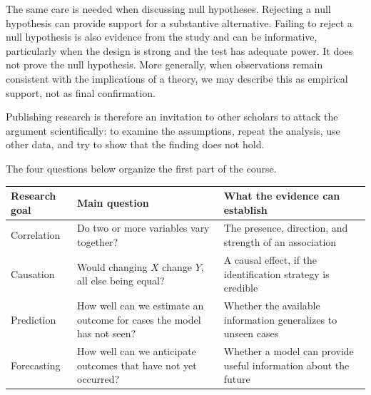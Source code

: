 \documentclass[
  a4paper,
]{scrbook}
\newcounter{none} %
\begin{document}
The same care is needed when discussing null hypotheses. Rejecting a
null hypothesis can provide support for a substantive alternative.
Failing to reject a null hypothesis is also evidence from the study and
can be informative, particularly when the design is strong and the test
has adequate power. It does not prove the null hypothesis. More
generally, when observations remain consistent with the implications of
a theory, we may describe this as empirical support, not as final
confirmation.

Publishing research is therefore an invitation to other scholars to
attack the argument scientifically: to examine the assumptions, repeat
the analysis, use other data, and try to show that the finding does not
hold.

The four questions below organize the first part of the course.

{\def\LTcaptype{none} %
\begin{longtable}[]{@{}
  >{\raggedright\arraybackslash}p{}
  >{\raggedright\arraybackslash}p{}
  >{\raggedright\arraybackslash}p{}@{}}
\toprule\noalign{}
\begin{minipage}[b]{\linewidth}\raggedright
Research goal
\end{minipage} & \begin{minipage}[b]{\linewidth}\raggedright
Main question
\end{minipage} & \begin{minipage}[b]{\linewidth}\raggedright
What the evidence can establish
\end{minipage} \\
\midrule\noalign{}
\endhead
\bottomrule\noalign{}
\endlastfoot
Correlation & Do two or more variables vary together? & The presence,
direction, and strength of an association \\
Causation & Would changing \(X\) change \(Y\), all else being equal? & A
causal effect, if the identification strategy is credible \\
Prediction & How well can we estimate an outcome for cases the model has
not seen? & Whether the available information generalizes to unseen
cases \\
Forecasting & How well can we anticipate outcomes that have not yet
occurred? & Whether a model can provide useful information about the
future \\
\end{longtable}
}
\end{document}
